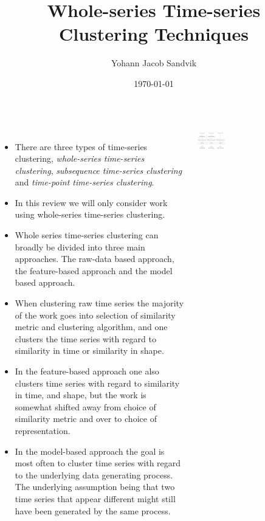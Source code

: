 \documentclass[18pt, a3paper, portrait]{tikzposter}
\title{Whole-series Time-series Clustering Techniques}
\author{Yohann Jacob Sandvik}
\date{\today}
\institute{Institute of Electronic Systems - NTNU}
\begin{document}
 
\maketitle 
\begin{columns}
    {
        \begin{itemize}
            \item There are three types of time-series clustering, \textit{whole-series time-series clustering}, \textit{subsequence time-series clustering} and \textit{time-point time-series clustering}.
            \item In this review we will only consider work using whole-series time-series clustering.
            \item Whole series time-series clustering can broadly be divided into three main approaches. The raw-data based approach, the feature-based approach and the model based approach.
            \item When clustering raw time series the majority of the work goes into selection of similarity metric and clustering algorithm, and one clusters the time series with regard to similarity in time or similarity in shape.
            \item In the feature-based approach one also clusters time series with regard to similarity in time, and shape, but the work is somewhat shifted away from choice of similarity metric and over to choice of representation.
            \item In the model-based approach the goal is most often to cluster time series with regard to the underlying data generating process. The underlying assumption being that two time series that appear different might still have been generated by the same process.
        \end{itemize}
    }
 
    \block{~}
    {
        \begin{tikzfigure}
            \includegraphics[width=0.25\textwidth]{images/tsc_appraches.png}
        \end{tikzfigure}
    }
\end{columns}
\end{document}
